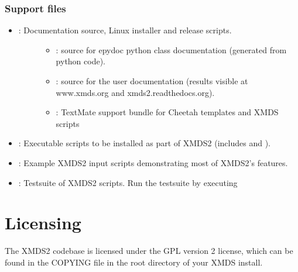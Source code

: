 \documentclass[letterpaper,10pt,english]{sphinxmanual}
\begin{document}
\subsection{Support files}
\label{\detokenize{developer:support-files}}\begin{itemize}
\item {} \begin{description}
\item[{: Documentation source, Linux installer and release scripts.}] \leavevmode\begin{itemize}
\item {} 
\sphinxAtStartPar
{}: source for epydoc python class documentation (generated from python code).

\item {} 
\sphinxAtStartPar
{}: source for the user documentation (results visible at www.xmds.org and xmds2.readthedocs.org).

\item {} 
\sphinxAtStartPar
{}: TextMate support bundle for Cheetah templates and XMDS scripts

\end{itemize}

\end{description}

\item {} 
\sphinxAtStartPar
{}: Executable scripts to be installed as part of XMDS2 (includes  and ).

\item {} 
\sphinxAtStartPar
{}: Example XMDS2 input scripts demonstrating most of XMDS2’s features.

\item {} 
\sphinxAtStartPar
{}: Testsuite of XMDS2 scripts.  Run the testsuite by executing 

\end{itemize}

\ignorespaces 

\chapter{Licensing}
\label{\detokenize{licensing:licensing}}\label{\detokenize{licensing:index-0}}\label{\detokenize{licensing:id1}}\label{\detokenize{licensing::doc}}
\sphinxAtStartPar
The XMDS2 codebase is licensed under the GPL version 2 license, which can be found in the COPYING file in the root directory of your XMDS install.
\end{document}
